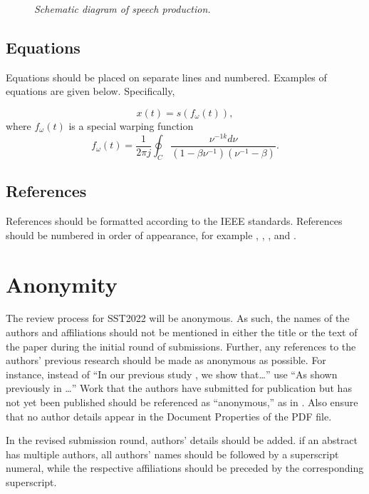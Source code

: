 \documentclass[a4paper]{article}
\begin{document}
\begin{figure}[thb]
\centerline{}
\caption{{\it Schematic diagram of speech production.}}
\label{spprod}
\end{figure}

\subsection{Equations}

Equations should be placed on separate lines and numbered. Examples
of equations are given below.
Specifically,

\begin{equation}
x(t) = s(f_\omega(t)),
\label{eq1}
\end{equation}
where \(f_\omega(t)\) is a special warping function
\begin{equation}
f_\omega(t)=\frac{1}{2\pi j}\oint_C \frac{\nu^{-1k}d\nu}
{(1-\beta\nu^{-1})(\nu^{-1}-\beta)}.
\label{eq2}
\end{equation}

\subsection{References}

References should be formatted according to the IEEE standards.
References should be numbered in order of appearance,
for example \cite{ES2}, \cite{ES3},  \cite{ES4}, and \cite{ES5}.

\section{Anonymity}

The review process for SST2022 will be anonymous. As such, the names of the authors and affiliations should not be mentioned in either the title or the text of the paper during the initial round of submissions. Further, any references to the authors' previous research should be made as anonymous as possible.  For instance, instead of ``In our previous study \cite{ES2}, we show that\ldots'' use ``As shown previously in \cite{ES2}\ldots''
Work that the authors have submitted for publication but has not yet been published should be referenced as ``anonymous,'' as in \cite{ES5}.
Also ensure that no author details appear in the Document Properties of the PDF file.

In the revised submission round, authors' details should be added.  if an abstract has multiple authors, all authors' names should be followed by a superscript numeral, while the respective affiliations should be preceded by the corresponding superscript.
\end{document}
